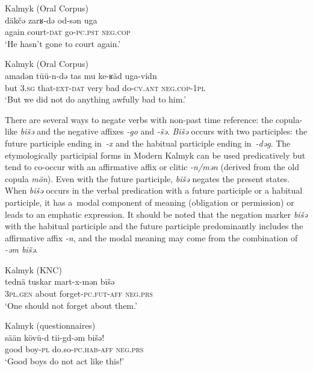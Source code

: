 \documentclass[output=paper]{langsci/langscibook}
\begin{document}
\ea Kalmyk (Oral Corpus) \label{ex:BK44}\\
	\gll däkčǝ	zarʁ-dǝ		od-sǝn		uga\\
	again	court-\textsc{dat}	go-\textsc{pc.pst}	\textsc{neg.cop}\\
	\glt `He hasn’t gone to court again.'
\z

\ea Kalmyk (Oral Corpus) \label{ex:BK45}\\
	\gll a\footnotemark	madǝn	tüü-n-dǝ			tas		mu	ke-ʁäd	uga-vidn\\
	but	\textsc{3.sg}		that-\textsc{ext-dat}	very	bad	do-\textsc{cv.ant}	\textsc{neg.cop-1pl}\\
	\glt `But we did not do anything awfully bad to him.'
\z


There are several ways to negate verbs with non-past time reference: the copula-like \textit{bišǝ} and the negative affixes \textit{-go} and \textit{-šǝ}. \textit{Bišǝ} occurs with two participles: the future participle ending in \textit{-x} and the habitual participle ending in \textit{-dəg}. The etymologically participial forms in Modern Kalmyk can be used predicatively but tend to co-occur with an affirmative affix or clitic \textit{-n/mən} (derived from the old copula \textit{mön}). Even with the future participle, \textit{bišǝ} negates the present states. When \textit{bišǝ} occurs in the verbal predication with a future participle or a habitual participle, it has a modal component of meaning (obligation or permission) or leads to an emphatic expression. It should be noted that the negation marker \textit{bišǝ} with the habitual participle and the future participle predominantly includes the affirmative affix \textit{-n}, and the modal meaning may come from the combination of \textit{-ǝm bišǝ}.

\ea Kalmyk (KNC) \label{ex:BK46}\\
	\gll tednä		tuskar	mart-x-mǝn			bišǝ\\
	\textsc{3pl.gen}	about		forget-\textsc{pc.fut-aff}	\textsc{neg.prs}\\
	\glt `One should not forget about them.'
\z

\ea Kalmyk (questionnaires) \label{ex:BK47}\\
	\gll sään	kövü-d	tii-gd-ǝm				bišǝ!\\
	good	boy-\textsc{pl}	do.so-\textsc{pc.hab-aff}	\textsc{neg.prs}\\
	\glt `Good boys do not act like this!'
\z
\end{document}
